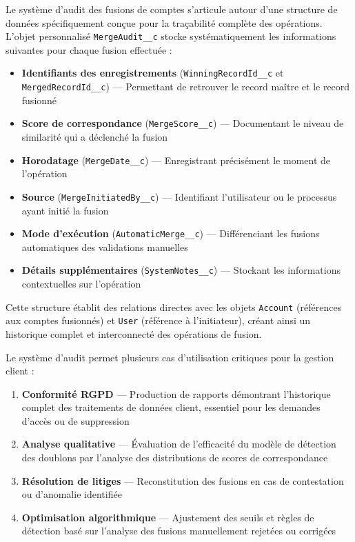 Le système d'audit des fusions de comptes s'articule autour d'une structure de données spécifiquement conçue pour la traçabilité complète des opérations. L'objet personnalisé \texttt{MergeAudit\_\_c} stocke systématiquement les informations suivantes pour chaque fusion effectuée :

\begin{itemize}
    \item \textbf{Identifiants des enregistrements} (\texttt{WinningRecordId\_\_c} et \texttt{MergedRecordId\_\_c}) — Permettant de retrouver le record maître et le record fusionné
    \item \textbf{Score de correspondance} (\texttt{MergeScore\_\_c}) — Documentant le niveau de similarité qui a déclenché la fusion
    \item \textbf{Horodatage} (\texttt{MergeDate\_\_c}) — Enregistrant précisément le moment de l'opération
    \item \textbf{Source} (\texttt{MergeInitiatedBy\_\_c}) — Identifiant l'utilisateur ou le processus ayant initié la fusion
    \item \textbf{Mode d'exécution} (\texttt{AutomaticMerge\_\_c}) — Différenciant les fusions automatiques des validations manuelles
    \item \textbf{Détails supplémentaires} (\texttt{SystemNotes\_\_c}) — Stockant les informations contextuelles sur l'opération
\end{itemize}

Cette structure établit des relations directes avec les objets \texttt{Account} (références aux comptes fusionnés) et \texttt{User} (référence à l'initiateur), créant ainsi un historique complet et interconnecté des opérations de fusion.

Le système d'audit permet plusieurs cas d'utilisation critiques pour la gestion client :

\begin{enumerate}
    \item \textbf{Conformité RGPD} — Production de rapports démontrant l'historique complet des traitements de données client, essentiel pour les demandes d'accès ou de suppression
    \item \textbf{Analyse qualitative} — Évaluation de l'efficacité du modèle de détection des doublons par l'analyse des distributions de scores de correspondance
    \item \textbf{Résolution de litiges} — Reconstitution des fusions en cas de contestation ou d'anomalie identifiée
    \item \textbf{Optimisation algorithmique} — Ajustement des seuils et règles de détection basé sur l'analyse des fusions manuellement rejetées ou corrigées
\end{enumerate}

